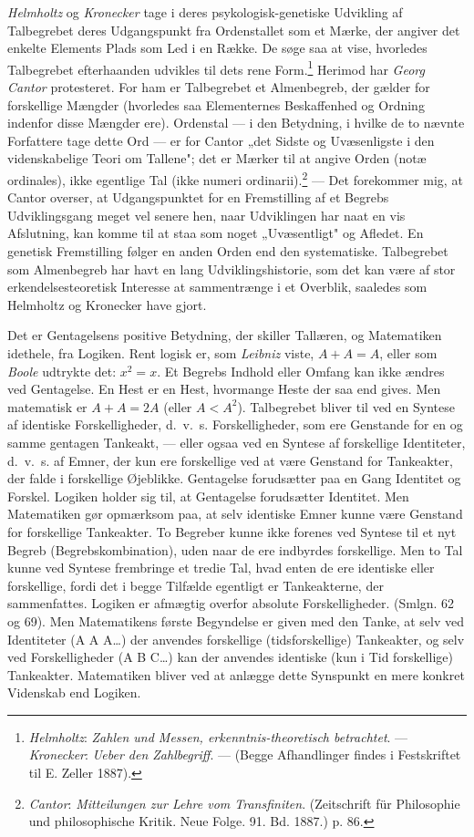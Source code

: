 \documentclass[12pt,a4paper]{book}
\newcommand{\apage}[1]{\marginnote{\footnotesize\textit{[#1]}}}
\begin{document}
\emph{Helmholtz} og \emph{Kronecker} tage i deres psykologisk-genetiske
Udvikling af Talbegrebet deres Udgangspunkt fra Ordenstallet som et
Mærke, der angiver det enkelte Elements Plads som Led i en Række. De
søge saa at vise, hvorledes Talbegrebet efterhaanden udvikles til dets
rene Form.\footnote{\emph{Helmholtz}: \emph{Zahlen und Messen,
erkenntnis-theoretisch betrachtet}. --- \emph{Kronecker}: \emph{Ueber
den Zahlbegriff}. --- (Begge Afhandlinger findes i Festskriftet til E.
Zeller 1887).} Herimod har \emph{Georg Cantor} protesteret. For ham er
Talbegrebet et Almenbegreb, der gælder for forskellige Mængder
(hvorledes saa Elementernes Beskaffenhed og Ordning indenfor disse
Mængder ere). Ordenstal --- i den Betydning, i hvilke de to nævnte
Forfattere tage dette Ord --- er for Cantor „det Sidste og
Uvæsenligste i den videnskabelige Teori om Tallene"; det er Mærker til
at angive Orden (notæ ordinales), ikke egentlige Tal (ikke numeri
ordinarii).\footnote{\emph{Cantor}: \emph{Mitteilungen zur Lehre vom
Transfiniten}. (Zeitschrift für Philosophie und philosophische Kritik.
Neue Folge. 91. Bd. 1887.) p. 86.} --- Det forekommer mig, at Cantor
overser, at Udgangspunktet for en Fremstilling af et Begrebs
Udviklingsgang meget vel senere hen, naar Udviklingen har naat en vis
Afslutning, kan komme til at staa som noget „Uvæsentligt" og Afledet.
En genetisk Fremstilling følger en anden Orden end den systematiske.
Talbegrebet som Almenbegreb har havt en lang Udviklingshistorie, som det
kan være af stor erkendelsesteoretisk Interesse at sammentrænge i et
Overblik, saaledes som Helmholtz og Kronecker have gjort.

Det er Gentagelsens positive Betydning, der skiller Tallæren, og
Matematiken idethele, fra Logiken. Rent logisk er, som \emph{Leibniz}
viste, $A + A = A$, eller som \emph{Boole} udtrykte \apage{192} det: $x^2 = x$. Et
Begrebs Indhold eller Omfang kan ikke ændres ved Gentagelse. En Hest er
en Hest, hvormange Heste der saa end gives. Men matematisk er $A + A =
2A$ (eller $A < A^2$). Talbegrebet bliver til ved en Syntese af
identiske Forskelligheder, d.\ v.\ s. Forskelligheder, som ere
Genstande for en og samme gentagen Tankeakt, --- eller ogsaa ved en
Syntese af forskellige Identiteter, d.\ v.\ s. af Emner, der kun ere
forskellige ved at være Genstand for Tankeakter, der falde i
forskellige Øjeblikke. Gentagelse forudsætter paa en Gang Identitet og
Forskel. Logiken holder sig til, at Gentagelse forudsætter Identitet.
Men Matematiken gør opmærksom paa, at selv identiske Emner kunne være
Genstand for forskellige Tankeakter. To Begreber kunne ikke forenes ved
Syntese til et nyt Begreb (Begrebskombination), uden naar de ere
indbyrdes forskellige. Men to Tal kunne ved Syntese frembringe et
tredie Tal, hvad enten de ere identiske eller forskellige, fordi det i
begge Tilfælde egentligt er Tankeakterne, der sammenfattes. Logiken er
afmægtig overfor absolute Forskelligheder. (Smlgn. 62 og 69). Men
Matematikens første Begyndelse er given med den Tanke, at selv ved
Identiteter (A A A\ldots) der anvendes forskellige (tidsforskellige)
Tankeakter, og selv ved Forskelligheder (A B C\ldots) kan der anvendes
identiske (kun i Tid forskellige) Tankeakter. Matematiken bliver ved at
anlægge dette Synspunkt en mere konkret Videnskab end Logiken.
\end{document}
